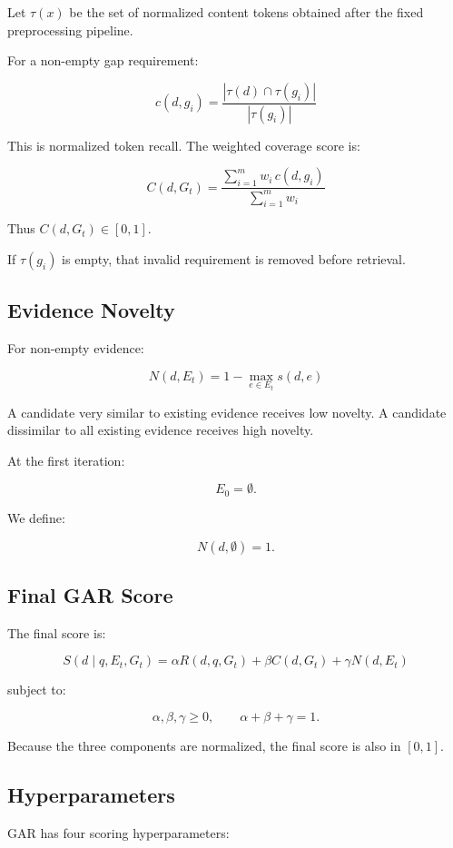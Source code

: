 \documentclass[11pt,a4paper]{article}
\begin{document}
Let $\tau(x)$ be the set of normalized content tokens obtained after the fixed preprocessing pipeline.

For a non-empty gap requirement:

\[
\boxed{
c(d,g_i)
=
\frac{
|\tau(d)\cap\tau(g_i)|
}{
|\tau(g_i)|
}
}
\tag{4}
\]

This is normalized token recall. The weighted coverage score is:

\[
\boxed{
C(d,G_t)
=
\frac{
\sum_{i=1}^{m}w_i\,c(d,g_i)
}{
\sum_{i=1}^{m}w_i
}
}
\tag{5}
\]

Thus $C(d,G_t)\in[0,1]$.

If $\tau(g_i)$ is empty, that invalid requirement is removed before retrieval.

\subsection{Evidence Novelty}

For non-empty evidence:

\[
\boxed{
N(d,E_t)
=
1-\max_{e\in E_t}s(d,e)
}
\tag{6}
\]

A candidate very similar to existing evidence receives low novelty. A candidate dissimilar to all existing evidence receives high novelty.

At the first iteration:

\[
E_0=\emptyset.
\]

We define:

\[
\boxed{N(d,\emptyset)=1.}
\tag{7}
\]

\subsection{Final GAR Score}

The final score is:

\[
\boxed{
S(d\mid q,E_t,G_t)
=
\alpha R(d,q,G_t)
+
\beta C(d,G_t)
+
\gamma N(d,E_t)
}
\tag{8}
\]

subject to:

\[
\boxed{
\alpha,\beta,\gamma\geq0,
\qquad
\alpha+\beta+\gamma=1.
}
\tag{9}
\]

Because the three components are normalized, the final score is also in $[0,1]$.

\subsection{Hyperparameters}

GAR has four scoring hyperparameters:
\end{document}
